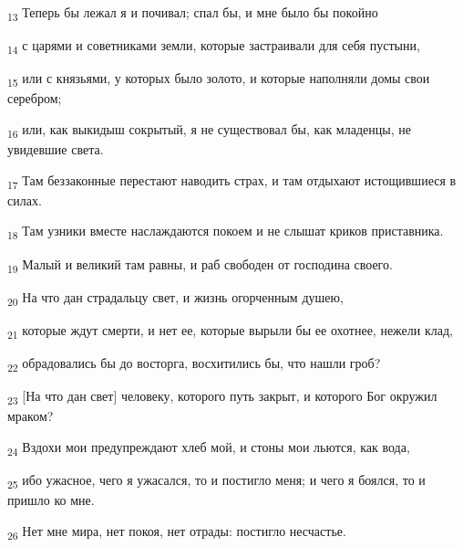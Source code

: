 \begin{tcolorbox}
\textsubscript{13} Теперь бы лежал я и почивал; спал бы, и мне было бы покойно
\end{tcolorbox}
\begin{tcolorbox}
\textsubscript{14} с царями и советниками земли, которые застраивали для себя пустыни,
\end{tcolorbox}
\begin{tcolorbox}
\textsubscript{15} или с князьями, у которых было золото, и которые наполняли домы свои серебром;
\end{tcolorbox}
\begin{tcolorbox}
\textsubscript{16} или, как выкидыш сокрытый, я не существовал бы, как младенцы, не увидевшие света.
\end{tcolorbox}
\begin{tcolorbox}
\textsubscript{17} Там беззаконные перестают наводить страх, и там отдыхают истощившиеся в силах.
\end{tcolorbox}
\begin{tcolorbox}
\textsubscript{18} Там узники вместе наслаждаются покоем и не слышат криков приставника.
\end{tcolorbox}
\begin{tcolorbox}
\textsubscript{19} Малый и великий там равны, и раб свободен от господина своего.
\end{tcolorbox}
\begin{tcolorbox}
\textsubscript{20} На что дан страдальцу свет, и жизнь огорченным душею,
\end{tcolorbox}
\begin{tcolorbox}
\textsubscript{21} которые ждут смерти, и нет ее, которые вырыли бы ее охотнее, нежели клад,
\end{tcolorbox}
\begin{tcolorbox}
\textsubscript{22} обрадовались бы до восторга, восхитились бы, что нашли гроб?
\end{tcolorbox}
\begin{tcolorbox}
\textsubscript{23} [На что дан свет] человеку, которого путь закрыт, и которого Бог окружил мраком?
\end{tcolorbox}
\begin{tcolorbox}
\textsubscript{24} Вздохи мои предупреждают хлеб мой, и стоны мои льются, как вода,
\end{tcolorbox}
\begin{tcolorbox}
\textsubscript{25} ибо ужасное, чего я ужасался, то и постигло меня; и чего я боялся, то и пришло ко мне.
\end{tcolorbox}
\begin{tcolorbox}
\textsubscript{26} Нет мне мира, нет покоя, нет отрады: постигло несчастье.
\end{tcolorbox}
